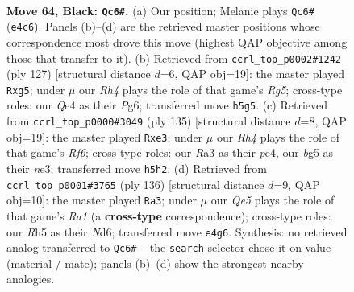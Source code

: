 \documentclass[11pt]{article}
\begin{document}
\clearpage

\begin{figure}[p]\centering
\begin{subfigure}{0.46\textwidth}\centering
\resizebox{\linewidth}{!}{%
\newchessgame
\chessboard[
  setfen={8/8/1K1k4/6Br/4q3/r7/8/8 b - - 1 64},
  showmover=false,
  pgfstyle=straightmove, color=movearrow, markmove={e4-c6}
]}
\caption{}
\end{subfigure}\hfill
\begin{subfigure}{0.46\textwidth}\centering
\resizebox{\linewidth}{!}{%
\newchessgame
\chessboard[
  setfen={8/R7/4k1p1/6B1/6r1/8/5K2/8 b - - 1 64},
  showmover=false,
  pgfstyle=straightmove, color=movearrow, markmove={g4-g5}
]}
\caption{}
\end{subfigure}
\\[4pt]
\begin{subfigure}{0.46\textwidth}\centering
\resizebox{\linewidth}{!}{%
\newchessgame
\chessboard[
  setfen={2k5/8/4K3/8/4P3/4Nr2/7B/8 b - - 0 68},
  showmover=false,
  pgfstyle=straightmove, color=movearrow, markmove={f3-e3}
]}
\caption{}
\end{subfigure}\hfill
\begin{subfigure}{0.46\textwidth}\centering
\resizebox{\linewidth}{!}{%
\newchessgame
\chessboard[
  setfen={1r6/8/3N1K1k/8/4b3/8/8/R7 w - - 6 69},
  showmover=false,
  pgfstyle=straightmove, color=movearrow, markmove={a1-a3}
]}
\caption{}
\end{subfigure}
\caption{\textbf{Move 64, Black: \texttt{Qc6\#}.} (a) Our position; Melanie plays \texttt{Qc6\#} (\texttt{e4c6}). Panels (b)--(d) are the retrieved master positions whose correspondence most drove this move (highest QAP objective among those that transfer to it). (b) Retrieved from \texttt{ccrl\_top\_p0002\#1242} (ply 127) [structural distance $d$=6, QAP obj=19]: the master played \texttt{Rxg5}; under $\mu$ our \emph{Rh4} plays the role of that game's \emph{Rg5}; cross-type roles: our \emph{Q}e4 as their \emph{P}g6; transferred move \texttt{h5g5}. (c) Retrieved from \texttt{ccrl\_top\_p0000\#3049} (ply 135) [structural distance $d$=8, QAP obj=19]: the master played \texttt{Rxe3}; under $\mu$ our \emph{Rh4} plays the role of that game's \emph{Rf6}; cross-type roles: our \emph{R}a3 as their \emph{p}e4, our \emph{b}g5 as their \emph{n}e3; transferred move \texttt{h5h2}. (d) Retrieved from \texttt{ccrl\_top\_p0001\#3765} (ply 136) [structural distance $d$=9, QAP obj=10]: the master played \texttt{Ra3}; under $\mu$ our \emph{Qe5} plays the role of that game's \emph{Ra1} (a \textbf{cross-type} correspondence); cross-type roles: our \emph{R}h5 as their \emph{N}d6; transferred move \texttt{e4g6}. Synthesis: no retrieved analog transferred to \texttt{Qc6\#} -- the \texttt{search} selector chose it on value (material / mate); panels (b)--(d) show the strongest nearby analogies.}
\label{fig:thought-m127}
\end{figure}
\end{document}

